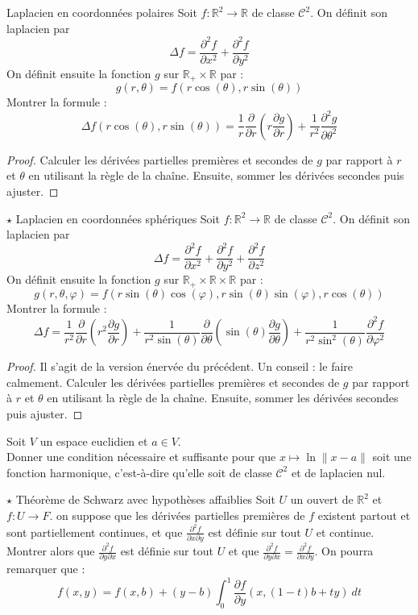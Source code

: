 \documentclass[french,a4paper]{article}
\newcommand{\R}{\mathbb{R}}
\theoremstyle{plain}
\theoremstyle{definition}
\theoremstyle{remark}
\begin{document}
\begin{ex}[Laf]{Laplacien en coordonnées polaires}
	Soit $f:\R^2\to\R$ de classe $\mathcal{C}^2$. On définit son laplacien par $$\Delta f=\frac{\partial^2 f}{\partial x^2}+\frac{\partial^2 f}{\partial y^2}$$ On définit ensuite la fonction $g$ sur $\R_+\times\R$ par : $$g(r,\theta)=f(r\cos(\theta),r\sin(\theta))$$ Montrer la formule : $$\Delta f(r\cos(\theta),r\sin(\theta))=\frac{1}{r}\frac{\partial}{\partial r}\left(r\frac{\partial g}{\partial r}\right)+\frac{1}{r^2}\frac{\partial^2 g}{\partial\theta^2}$$
\end{ex}
\begin{proof}
	Calculer les dérivées partielles premières et secondes de $g$ par rapport à $r$ et $\theta$ en utilisant la règle de la chaîne. Ensuite, sommer les dérivées secondes puis ajuster.
\end{proof}

\begin{ex}[Méchanceté]{$\star$ Laplacien en coordonnées sphériques}
	Soit $f:\R^2\to\R$ de classe $\mathcal{C}^2$. On définit son laplacien par $$\Delta f=\frac{\partial^2 f}{\partial x^2}+\frac{\partial^2 f}{\partial y^2}+\frac{\partial^2 f}{\partial z^2}$$ On définit ensuite la fonction $g$ sur $\R_+\times\R\times\R$ par : $$g(r,\theta,\varphi)=f(r\sin(\theta)\cos(\varphi),r\sin(\theta)\sin(\varphi),r\cos(\theta))$$ Montrer la formule : $$\Delta f=\frac{1}{r^2}\frac{\partial}{\partial r}\left(r^2\frac{\partial g}{\partial r}\right)+\frac{1}{r^2\sin(\theta)}\frac{\partial}{\partial\theta}\left(\sin(\theta)\frac{\partial g}{\partial\theta}\right)+\frac{1}{r^2\sin^2(\theta)}\frac{\partial^2 f}{\partial\varphi^2}$$
\end{ex}
\begin{proof}
	Il s'agit de la version énervée du précédent. Un conseil : le faire calmement. Calculer les dérivées partielles premières et secondes de $g$ par rapport à $r$ et $\theta$ en utilisant la règle de la chaîne. Ensuite, sommer les dérivées secondes puis ajuster.
\end{proof}

\begin{ex}[Moulin.CD.28]{}
	Soit $V$ un espace euclidien et $a\in V$. \\ Donner une condition nécessaire et suffisante pour que $x\mapsto\ln\lVert x-a\rVert$ soit une fonction harmonique, c'est-à-dire qu'elle soit de classe $\mathcal{C}^2$ et de laplacien nul.
\end{ex}

\begin{ex}[Moulin.CD.29]{$\star$ Théorème de Schwarz avec hypothèses affaiblies}
	Soit $U$ un ouvert de $\R^2$ et $f:U\to F$. on suppose que les dérivées partielles premières de $f$ existent partout et sont partiellement continues, et que $\displaystyle\frac{\partial^2 f}{\partial x\partial y}$ est définie sur tout $U$ et continue. Montrer alors que $\displaystyle\frac{\partial^2f}{\partial y\partial x}$ est définie sur tout $U$ et que $\displaystyle\frac{\partial^2f}{\partial y\partial x}=\frac{\partial^2 f}{\partial x\partial y}$. On pourra remarquer que : $$f(x,y)=f(x,b)+(y-b)\int_{0}^{1}\frac{\partial f}{\partial y}(x,(1-t)b+ty)\ dt$$
\end{ex}
\end{document}
